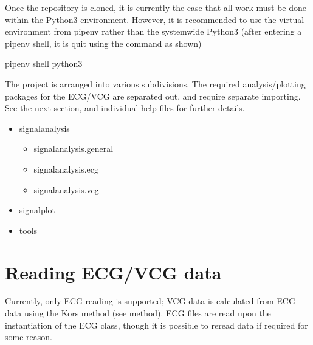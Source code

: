 \documentclass[letterpaper,10pt,english]{sphinxmanual}
\begin{document}
\sphinxAtStartPar
Once the repository is cloned, it is currently the case that all work must be done within the Python3 environment. However, it is recommended to use the virtual environment from pipenv rather than the system\sphinxhyphen{}wide Python3 (after entering a pipenv shell, it is quit using the  command as shown)

\begin{sphinxVerbatim}[commandchars=\\\{\}]
pipenv shell
 python3
 
\end{sphinxVerbatim}

\sphinxAtStartPar
The project is arranged into various subdivisions. The required analysis/plotting packages for the ECG/VCG are separated out, and require separate importing. See the next section, and individual help files for further details.
\begin{itemize}
\item {} 
\sphinxAtStartPar
signalanalysis
\begin{itemize}
\item {} 
\sphinxAtStartPar
signalanalysis.general

\item {} 
\sphinxAtStartPar
signalanalysis.ecg

\item {} 
\sphinxAtStartPar
signalanalysis.vcg

\end{itemize}

\item {} 
\sphinxAtStartPar
signalplot

\item {} 
\sphinxAtStartPar
tools

\end{itemize}


\section{Reading ECG/VCG data}
\label{\detokenize{usage:reading-ecg-vcg-data}}\label{\detokenize{usage:reading}}
\sphinxAtStartPar
Currently, only ECG reading is supported; VCG data is calculated from ECG data using the Kors method (see method). ECG files are read upon the instantiation of the ECG class, though it is possible to re\sphinxhyphen{}read data if required for some reason.
\end{document}
